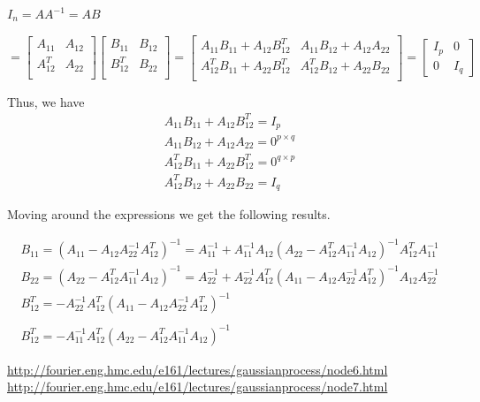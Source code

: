 \documentclass{beamer}
\begin{document}
\begin{frame}
$I_n = AA^{-1} = AB$

$=\begin{bmatrix}
A_{11} & A_{12}\\
A_{12}^T & A_{22} \\
\end{bmatrix} \begin{bmatrix}
B_{11} & B_{12}\\
B_{12}^T & B_{22} \\
\end{bmatrix}
= \begin{bmatrix}
A_{11}B_{11} +A_{12}B_{12}^T & A_{11}B_{12} + A_{12}A_{22}\\
A_{12}^TB_{11} + A_{22}B_{12}^T & A_{12}^TB_{12} + A_{22}B_{22}  \\
\end{bmatrix} = \begin{bmatrix}
I_p & 0 \\
0 & I_q
\end{bmatrix}$

Thus, we have
\begin{gather}
A_{11}B_{11} +A_{12}B_{12}^T = I_p\\
A_{11}B_{12} + A_{12}A_{22} = 0^{p\times q}\\
A_{12}^TB_{11} + A_{22}B_{12}^T = 0^{q\times p}\\
A_{12}^TB_{12} + A_{22}B_{22} = I_q
\end{gather}
\end{frame}

\begin{frame}
Moving around the expressions we get the following results.

\begin{gather}
	B_{11} = (A_{11} - A_{12}A_{22}^{-1}A_{12}^T)^{-1} = A_{11}^{-1} + A_{11}^{-1}A_{12}(A_{22} - A_{12}^TA_{11}^{-1}A_{12})^{-1}A_{12}^TA_{11}^{-1}\\
	B_{22} = (A_{22} - A_{12}^TA_{11}^{-1}A_{12})^{-1} = A_{22}^{-1} + A_{22}^{-1}A_{12}^T(A_{11} - A_{12}A_{22}^{-1}A_{12}^T)^{-1}A_{12}A_{22}^{-1}\\
	B_{12}^T = - A_{22}^{-1}A_{12}^T ( A_{11} - A_{12} A_{22}^{-1} A_{12}^T)^{-1}\\\\
	B_{12}^T = - A_{11}^{-1}A_{12}^T ( A_{22} - A_{12} ^TA_{11}^{-1} A_{12})^{-1}
\end{gather}
\end{frame}


\urldef\nodeSix\url{http://fourier.eng.hmc.edu/e161/lectures/gaussianprocess/node6.html}
\urldef\nodeSeven\url{http://fourier.eng.hmc.edu/e161/lectures/gaussianprocess/node7.html}
\end{document}
